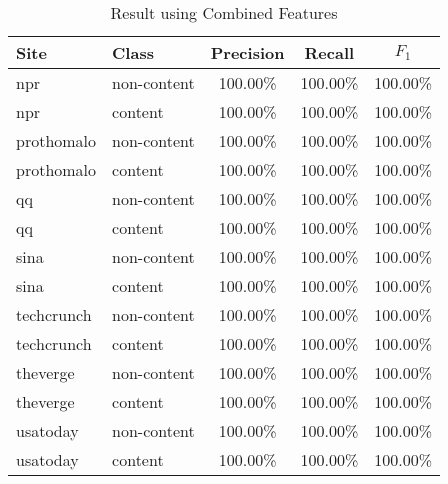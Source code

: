 \documentclass{acm_proc_article-sp}
\begin{document}
\begin{table}
\centering
\caption{\label{table:combined}Result using Combined Features}
\begin{tabular}{|l|l|c|c|c|} \hline
Site&Class&Precision&Recall&$F_1$\\ \hline\hline
npr&non-content&100.00\%&100.00\%&100.00\%\\ \hline
npr&content&100.00\%&100.00\%&100.00\%\\ \hline
prothomalo&non-content&100.00\%&100.00\%&100.00\%\\ \hline
prothomalo&content&100.00\%&100.00\%&100.00\%\\ \hline
qq&non-content&100.00\%&100.00\%&100.00\%\\ \hline
qq&content&100.00\%&100.00\%&100.00\%\\ \hline
sina&non-content&100.00\%&100.00\%&100.00\%\\ \hline
sina&content&100.00\%&100.00\%&100.00\%\\ \hline
techcrunch&non-content&100.00\%&100.00\%&100.00\%\\ \hline
techcrunch&content&100.00\%&100.00\%&100.00\%\\ \hline
theverge&non-content&100.00\%&100.00\%&100.00\%\\ \hline
theverge&content&100.00\%&100.00\%&100.00\%\\ \hline
usatoday&non-content&100.00\%&100.00\%&100.00\%\\ \hline
usatoday&content&100.00\%&100.00\%&100.00\%\\ \hline
\end{tabular}
\end{table}
\end{document}
